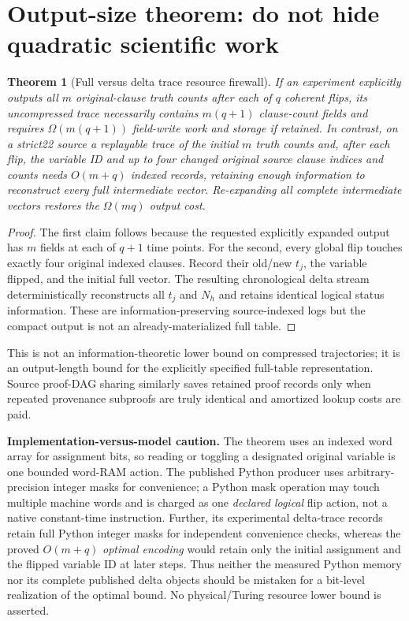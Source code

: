 \documentclass[10pt]{article}
\newtheorem{theorem}{Theorem}
\begin{document}
\section*{Output-size theorem: do not hide quadratic scientific work}
\begin{theorem}[Full versus delta trace resource firewall]
If an experiment explicitly outputs all $m$ original-clause truth counts after each of $q$ coherent flips, its uncompressed trace necessarily contains $m(q+1)$ clause-count fields and requires $\Omega(m(q+1))$ field-write work and storage if retained. In contrast, on a strict22 source a replayable trace of the initial $m$ truth counts and, after each flip, the variable ID and up to four changed original source clause indices and counts needs $O(m+q)$ indexed records, retaining enough information to reconstruct every full intermediate vector. Re-expanding all complete intermediate vectors restores the $\Omega(mq)$ output cost.
\end{theorem}
\begin{proof}
The first claim follows because the requested explicitly expanded output has $m$ fields at each of $q+1$ time points. For the second, every global flip touches exactly four original indexed clauses. Record their old/new $t_j$, the variable flipped, and the initial full vector. The resulting chronological delta stream deterministically reconstructs all $t_j$ and $N_h$ and retains identical logical status information. These are information-preserving source-indexed logs but the compact output is not an already-materialized full table.
\end{proof}
This is not an information-theoretic lower bound on compressed trajectories; it is an output-length bound for the explicitly specified full-table representation. Source proof-DAG sharing similarly saves retained proof records only when repeated provenance subproofs are truly identical and amortized lookup costs are paid.

\noindent\textbf{Implementation-versus-model caution.} The theorem uses an indexed word array for assignment bits, so reading or toggling a designated original variable is one bounded word-RAM action. The published Python producer uses arbitrary-precision integer masks for convenience; a Python mask operation may touch multiple machine words and is charged as one \emph{declared logical} flip action, not a native constant-time instruction. Further, its experimental delta-trace records retain full Python integer masks for independent convenience checks, whereas the proved $O(m+q)$ \emph{optimal encoding} would retain only the initial assignment and the flipped variable ID at later steps. Thus neither the measured Python memory nor its complete published delta objects should be mistaken for a bit-level realization of the optimal bound. No physical/Turing resource lower bound is asserted.
\end{document}
